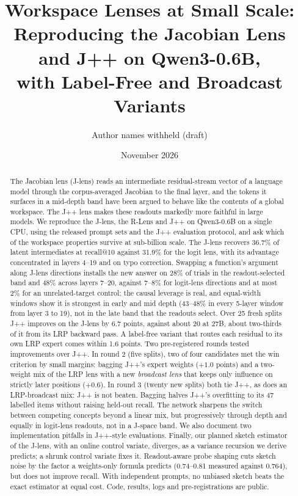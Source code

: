 \documentclass[11pt]{article}
\title{Workspace Lenses at Small Scale:\\
Reproducing the Jacobian Lens and J++ on Qwen3-0.6B,\\
with Label-Free and Broadcast Variants}
\author{Author names withheld (draft)}
\date{November 2026}
\theoremstyle{definition}
\begin{document}
\maketitle

\begin{abstract}
The Jacobian lens (J-lens) reads an intermediate residual-stream vector of a language model through
the corpus-averaged Jacobian to the final layer, and the tokens it surfaces in a mid-depth band have
been argued to behave like the contents of a global workspace. The J++ lens makes these readouts
markedly more faithful in large models. We reproduce the J-lens, the R-Lens and J++ on Qwen3-0.6B
on a single CPU, using the released prompt sets and the J++ evaluation protocol, and ask which of the
workspace properties survive at sub-billion scale. The J-lens recovers 36.7\% of latent
intermediates at recall@10 against 31.9\% for the logit lens, with its advantage concentrated in
layers 4--19 and on typo correction. Swapping a function's argument along J-lens directions installs
the new answer on 28\% of trials in the readout-selected band and 48\% across layers 7--20, against
7--8\% for logit-lens directions and at most 2\% for an unrelated-target control; the causal leverage
is real, and equal-width windows show it is strongest in early and mid depth (43--48\% in every
5-layer window from layer 3 to 19), not in the late band that the readouts select. Over 25 fresh splits J++
improves on the J-lens by 6.7 points, against about 20 at 27B, about two-thirds of it from its LRP
backward pass. A label-free variant that routes each residual to its own LRP expert comes within 1.6
points. Two pre-registered rounds tested improvements over J++. In round 2 (five splits), two of four
candidates met the win criterion by small margins: bagging J++'s expert weights ($+1.0$ points) and a
two-weight mix of the LRP lens with a new \emph{broadcast lens} that keeps only influence on strictly
later positions ($+0.6$). In round 3 (twenty new splits) both tie J++, as does an LRP-broadcast mix:
J++ is not beaten. Bagging halves J++'s overfitting to its 47 labelled items without raising held-out
recall. The network sharpens the switch between competing concepts beyond a linear mix, but
progressively through depth and equally in logit-lens readouts, not in a J-space band. We also document two implementation pitfalls in J++-style evaluations. Finally, our planned sketch
estimator of the J-lens, with an online control variate, diverges, as a variance recursion we
derive predicts; a shrunk control variate fixes it. Readout-aware probe shaping cuts sketch noise
by the factor a weights-only formula predicts (0.74--0.81 measured against 0.764), but does not
improve recall. With independent prompts, no unbiased sketch beats the exact estimator at equal cost.
Code, results, logs and pre-registrations are public.
\end{abstract}
\end{document}
